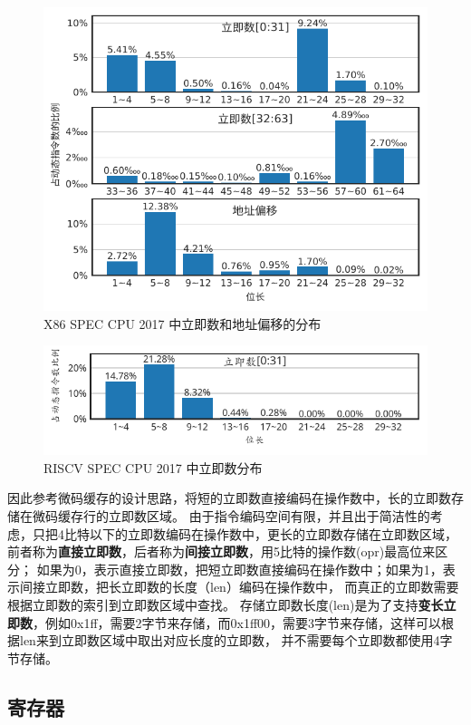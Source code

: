 \begin{figure}[h]
  \centering
  \includegraphics[width=0.8\linewidth]{./plot_pdf/immsize_x86.pdf}
  \caption{X86 SPEC CPU 2017 中立即数和地址偏移的分布}
  \label{img:immsize_x86}
\end{figure}

\begin{figure}[h]
  \centering
  \includegraphics[width=0.8\linewidth]{./plot_pdf/immsize_riscv.pdf}
  \caption{RISCV SPEC CPU 2017 中立即数分布}
  \label{img:immsize_riscv}
\end{figure}

因此参考微码缓存的设计思路，将短的立即数直接编码在操作数中，长的立即数存储在微码缓存行的立即数区域。
由于指令编码空间有限，并且出于简洁性的考虑，只把4比特以下的立即数编码在操作数中，更长的立即数存储在立即数区域，
前者称为\textbf{直接立即数}，后者称为\textbf{间接立即数}，用5比特的操作数(opr)最高位来区分；
如果为0，表示直接立即数，把短立即数直接编码在操作数中；如果为1，表示间接立即数，把长立即数的长度（len）编码在操作数中，
而真正的立即数需要根据立即数的索引到立即数区域中查找。
存储立即数长度(len)是为了支持\textbf{变长立即数}，例如0x1ff，需要2字节来存储，而0x1ff00，需要3字节来存储，这样可以根据len来到立即数区域中取出对应长度的立即数，
并不需要每个立即数都使用4字节存储。


\subsection{寄存器}

